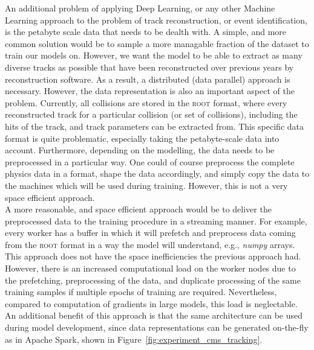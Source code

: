 An additional problem of applying Deep Learning, or any other Machine Learning approach to the problem of track reconstruction, or event identification, is the petabyte scale data that needs to be dealth with. A simple, and more common solution would be to sample a more managable fraction of the dataset to train our models on. However, we want the model to be able to extract as many diverse tracks as possible that have been reconstructed over previous years by reconstruction software. As a result, a distributed (data parallel) approach is necessary. However, the data representation is also an important aspect of the problem. Currently, all collisions are stored in the \textsc{root} format, where every reconstructed track for a particular collision (or set of collisions), including the hits of the track, and track parameters can be extracted from. This specific data format is quite problematic, especially taking the petabyte-scale data into account. Furthermore, depending on the modelling, the data needs to be preprocessed in a particular way. One could of course preprocess the complete physics data in a format, shape the data accordingly, and simply copy the data to the machines which will be used during training. However, this is not a very space efficient approach.\\

A more reasonable, and space efficient approach would be to deliver the preprocessed data to the training procedure in a streaming manner. For example, every worker has a buffer in which it will prefetch and preprocess data coming from the \textsc{root} format in a way the model will understand, e.g., \emph{numpy} arrays. This approach does not have the space inefficiencies the previous approach had. However, there is an increased computational load on the worker nodes due to the prefetching, preprocessing of the data, and duplicate processing of the same training samples if multiple epochs of training are required. Nevertheless, compared to computation of gradients in large models, this load is neglectable. An additional benefit of this approach is that the same architecture can be used during model development, since data representations can be generated on-the-fly as in Apache Spark, shown in Figure~\ref{fig:experiment_cms_tracking}.

